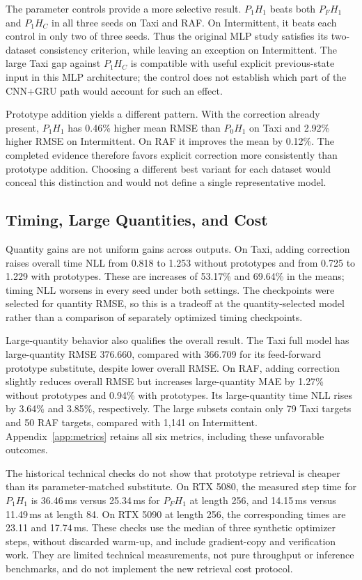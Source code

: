 \documentclass[runningheads]{llncs}
\begin{document}
The parameter controls provide a more selective result. $P_1H_1$ beats both $P_FH_1$ and $P_1H_C$ in all three seeds on Taxi and RAF. On Intermittent, it beats each control in only two of three seeds. Thus the original MLP study satisfies its two-dataset consistency criterion, while leaving an exception on Intermittent. The large Taxi gap against $P_1H_C$ is compatible with useful explicit previous-state input in this MLP architecture; the control does not establish which part of the CNN+GRU path would account for such an effect.

Prototype addition yields a different pattern. With the correction already present, $P_1H_1$ has 0.46\% higher mean RMSE than $P_0H_1$ on Taxi and 2.92\% higher RMSE on Intermittent. On RAF it improves the mean by 0.12\%. The completed evidence therefore favors explicit correction more consistently than prototype addition. Choosing a different best variant for each dataset would conceal this distinction and would not define a single representative model.

\subsection{Timing, Large Quantities, and Cost}
Quantity gains are not uniform gains across outputs. On Taxi, adding correction raises overall time NLL from 0.818 to 1.253 without prototypes and from 0.725 to 1.229 with prototypes. These are increases of 53.17\% and 69.64\% in the means; timing NLL worsens in every seed under both settings. The checkpoints were selected for quantity RMSE, so this is a tradeoff at the quantity-selected model rather than a comparison of separately optimized timing checkpoints.

Large-quantity behavior also qualifies the overall result. The Taxi full model has large-quantity RMSE 376.660, compared with 366.709 for its feed-forward prototype substitute, despite lower overall RMSE. On RAF, adding correction slightly reduces overall RMSE but increases large-quantity MAE by 1.27\% without prototypes and 0.94\% with prototypes. Its large-quantity time NLL rises by 3.64\% and 3.85\%, respectively. The large subsets contain only 79 Taxi targets and 50 RAF targets, compared with 1,141 on Intermittent. Appendix~\ref{app:metrics} retains all six metrics, including these unfavorable outcomes.

The historical technical checks do not show that prototype retrieval is cheaper than its parameter-matched substitute. On RTX 5080, the measured step time for $P_1H_1$ is 36.46\,ms versus 25.34\,ms for $P_FH_1$ at length 256, and 14.15\,ms versus 11.49\,ms at length 84. On RTX 5090 at length 256, the corresponding times are 23.11 and 17.74\,ms. These checks use the median of three synthetic optimizer steps, without discarded warm-up, and include gradient-copy and verification work. They are limited technical measurements, not pure throughput or inference benchmarks, and do not implement the new retrieval cost protocol.
\end{document}
